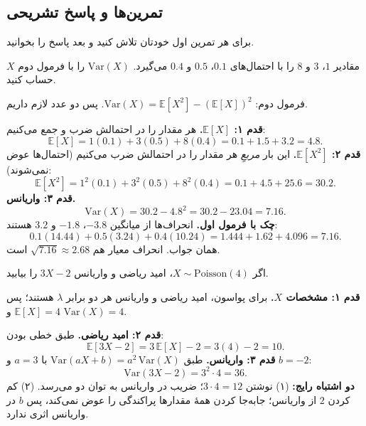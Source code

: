 \subsection*{تمرین‌ها و پاسخ تشریحی}

برای هر تمرین اول خودتان تلاش کنید و بعد پاسخ را بخوانید.

\begin{exercise}
  $X$ مقادیر $1$، $3$ و $8$ را با احتمال‌های $0.1$، $0.5$ و $0.4$ می‌گیرد. $\mathrm{Var}(X)$ را با فرمول دوم حساب کنید.
  \begin{solution}
    فرمول دوم: $\mathrm{Var}(X)=\mathbb E[X^2]-(\mathbb E[X])^2$. پس دو عدد لازم داریم.

    \textbf{قدم ۱: $\mathbb E[X]$.} هر مقدار را در احتمالش ضرب و جمع می‌کنیم:
    \[ \mathbb E[X]=1(0.1)+3(0.5)+8(0.4)=0.1+1.5+3.2=4.8. \]
    \textbf{قدم ۲: $\mathbb E[X^2]$.} این بار \emph{مربعِ} هر مقدار را در احتمالش ضرب می‌کنیم (احتمال‌ها عوض نمی‌شوند):
    \[ \mathbb E[X^2]=1^2(0.1)+3^2(0.5)+8^2(0.4)=0.1+4.5+25.6=30.2. \]
    \textbf{قدم ۳: واریانس.}
    \[ \mathrm{Var}(X)=30.2-4.8^2=30.2-23.04=7.16. \]
    \textbf{چک با فرمول اول.} انحراف‌ها از میانگین $-3.8$، $-1.8$ و $3.2$ هستند:
    \[ 0.1(14.44)+0.5(3.24)+0.4(10.24)=1.444+1.62+4.096=7.16. \]
    همان جواب. انحراف معیار هم $\sqrt{7.16}\approx2.68$ است.
  \end{solution}
\end{exercise}

\begin{exercise}
  اگر $X\sim\mathrm{Poisson}(4)$، امید ریاضی و واریانس $3X-2$ را بیابید.
  \begin{solution}
    \textbf{قدم ۱: مشخصات $X$.} برای پواسون، امید ریاضی و واریانس هر دو برابر $\lambda$ هستند؛ پس $\mathbb E[X]=4$ و $\mathrm{Var}(X)=4$.

    \textbf{قدم ۲: امید ریاضی.} طبق خطی بودن:
    \[ \mathbb E[3X-2]=3\,\mathbb E[X]-2=3(4)-2=10. \]
    \textbf{قدم ۳: واریانس.} طبق $\mathrm{Var}(aX+b)=a^2\,\mathrm{Var}(X)$ با $a=3$ و $b=-2$:
    \[ \mathrm{Var}(3X-2)=3^2\cdot4=36. \]
    \textbf{دو اشتباه رایج:} (۱) نوشتن $3\cdot4=12$؛ ضریب در واریانس به توان دو می‌رسد. (۲) کم کردن $2$ از واریانس؛ جابه‌جا کردن همهٔ مقدارها پراکندگی را عوض نمی‌کند، پس $b$ در واریانس اثری ندارد.
  \end{solution}
\end{exercise}

